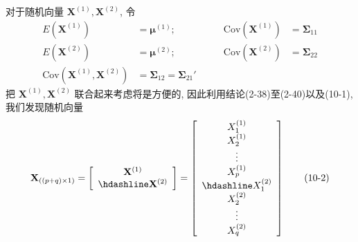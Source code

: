 对于随机向量 $\mathbf{X}^{(1)},\mathbf{X}^{(2)}$, 令
\label{eq:10-1}
\begin{equation}
\begin{aligned}
E(\mathbf{X}^{(1)})&=\boldsymbol{\mu}^{(1)}; &\qquad \mathrm{Cov}(\mathbf{X}^{(1)})&=\boldsymbol{\Sigma}_{11}\\
E(\mathbf{X}^{(2)})&=\boldsymbol{\mu}^{(2)}; &\qquad \mathrm{Cov}(\mathbf{X}^{(2)})&=\boldsymbol{\Sigma}_{22}\\
\mathrm{Cov}(\mathbf{X}^{(1)},\mathbf{X}^{(2)})&=\boldsymbol{\Sigma}_{12}=\boldsymbol{\Sigma}_{21}'
\end{aligned}
\tag{10-1}
\end{equation}
把 $\mathbf{X}^{(1)},\mathbf{X}^{(2)}$ 联合起来考虑将是方便的, 因此利用结论(2-38)至(2-40)以及(10-1), 我们发现随机向量
\label{eq:10-2}
\begin{equation}
\mathbf{X}_{((p+q)\times 1)}=\left[\begin{array}{c}
\mathbf{X}^{(1)}\\
\hdashline
\mathbf{X}^{(2)}
\end{array}\right]=\left[\begin{array}{c}
X_1^{(1)}\\
X_2^{(1)}\\
\vdots\\
X_p^{(1)}\\
\hdashline
X_1^{(2)}\\
X_2^{(2)}\\
\vdots\\
X_q^{(2)}
\end{array}\right]
\tag{10-2}
\end{equation}
